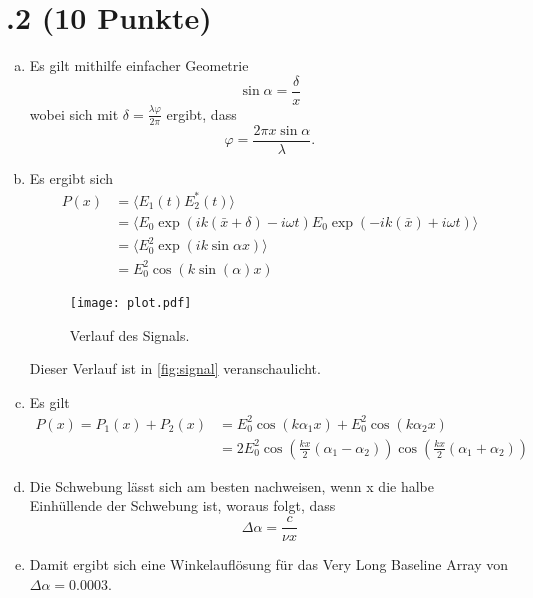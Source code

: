 \section*{\nr.2 \tittwo (10 Punkte)}
\begin{enumerate}[(a)]
\item Es gilt mithilfe einfacher Geometrie
\begin{equation}
  \sin \alpha = \frac{\delta}{x}
\end{equation}
wobei sich mit $\delta = \frac{\lambda \varphi}{2\pi}$ ergibt, dass
\begin{equation}
  \varphi = \frac{2\pi x \sin \alpha}{\lambda}.
\end{equation}
\item Es ergibt sich
\begin{align}
P(x)&=\langle E_1(t)E_2^{*}(t) \rangle\\
    &=\langle E_0\exp(ik(\bar x+\delta)-i\omega t)E_0\exp(-ik(\bar x)+i\omega t) \rangle\\
    &=\langle E_0^2\exp(ik\sin \alpha x) \rangle\\
    &=E_0^2 \cos (k\sin(\alpha)x)
\end{align}
\begin{figure}[htbp]
\centering
\texttt{[image: plot.pdf]}
\caption{Verlauf des Signals.}
\label{fig:signal}
\end{figure}

Dieser Verlauf ist in \vref{fig:signal} veranschaulicht.

\item Es gilt
\begin{align}
  P(x)=P_1(x)+P_2(x)&= E_0^2\cos(k\alpha_1x)+E_0^2\cos(k\alpha_2x)\\
    &=2E_0^2\cos \left( \frac{kx}{2}(\alpha_1-\alpha_2)\right)\cos \left( \frac{kx}{2}(\alpha_1+\alpha_2) \right)
\end{align}

\item Die Schwebung lässt sich am besten nachweisen, wenn x die halbe Einhüllende der Schwebung ist, woraus folgt, dass
\begin{equation}
  \Delta \alpha = \frac{c}{\nu x}
\end{equation}

\item  Damit ergibt sich eine Winkelauflösung für das Very Long Baseline Array von $\Delta \alpha = 0.0003$.

\end{enumerate}